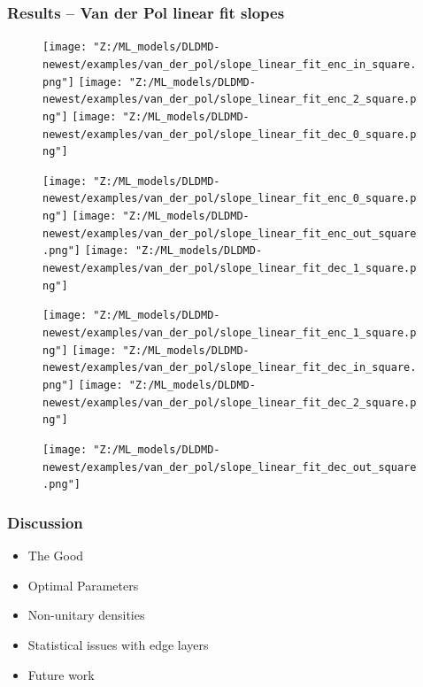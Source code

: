 \documentclass[11pt,aspectratio=169]{beamer}
\begin{document}
    \begin{frame}
        \frametitle{Results -- Van der Pol linear fit slopes} 
        \begin{figure}
            \centering
            \begin{minipage}{.3333\textwidth}
                \texttt{[image: "Z:/ML\_models/DLDMD-newest/examples/van\_der\_pol/slope\_linear\_fit\_enc\_in\_square.png"]}
                \texttt{[image: "Z:/ML\_models/DLDMD-newest/examples/van\_der\_pol/slope\_linear\_fit\_enc\_2\_square.png"]}
                \texttt{[image: "Z:/ML\_models/DLDMD-newest/examples/van\_der\_pol/slope\_linear\_fit\_dec\_0\_square.png"]}
            \end{minipage}%
            \begin{minipage}{.3333\textwidth}
                \texttt{[image: "Z:/ML\_models/DLDMD-newest/examples/van\_der\_pol/slope\_linear\_fit\_enc\_0\_square.png"]}
                \texttt{[image: "Z:/ML\_models/DLDMD-newest/examples/van\_der\_pol/slope\_linear\_fit\_enc\_out\_square.png"]}
                \texttt{[image: "Z:/ML\_models/DLDMD-newest/examples/van\_der\_pol/slope\_linear\_fit\_dec\_1\_square.png"]}
            \end{minipage}%
            \begin{minipage}{.3333\textwidth}
                \texttt{[image: "Z:/ML\_models/DLDMD-newest/examples/van\_der\_pol/slope\_linear\_fit\_enc\_1\_square.png"]}
                \texttt{[image: "Z:/ML\_models/DLDMD-newest/examples/van\_der\_pol/slope\_linear\_fit\_dec\_in\_square.png"]}
                \texttt{[image: "Z:/ML\_models/DLDMD-newest/examples/van\_der\_pol/slope\_linear\_fit\_dec\_2\_square.png"]}
            \end{minipage}
            \texttt{[image: "Z:/ML\_models/DLDMD-newest/examples/van\_der\_pol/slope\_linear\_fit\_dec\_out\_square.png"]}
        \end{figure}
    \end{frame}



    \begin{frame}
        \frametitle{Discussion}
        \begin{itemize}
            \item The Good \vspace{1cm}
            \item Optimal Parameters \vspace{1cm}
            \item Non-unitary densities \vspace{1cm}
            \item Statistical issues with edge layers \vspace{1cm}
            \item Future work
        \end{itemize}

    \end{frame}
\end{document}
